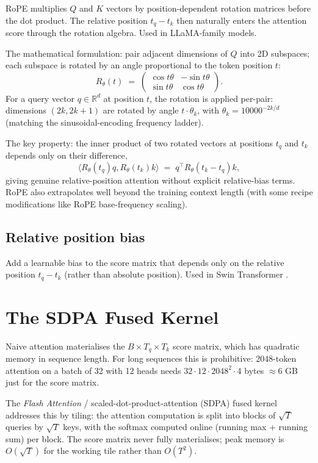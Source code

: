 RoPE \cite{su_roformer_2021} multiplies $Q$ and $K$ vectors by
position-dependent rotation matrices before the dot product.
The relative position $t_q - t_k$ then naturally enters the
attention score through the rotation algebra. Used in LLaMA-family
models.

The mathematical formulation: pair adjacent dimensions of $Q$
into 2D subspaces; each subspace is rotated by an angle
proportional to the token position $t$:
\[
  R_\theta(t)
  \;=\;
  \begin{pmatrix} \cos t\theta & -\sin t\theta \\
                  \sin t\theta &  \cos t\theta
  \end{pmatrix}.
\]
For a query vector $q \in \mathbb{R}^d$ at position $t$,
the rotation is applied per-pair: dimensions $(2k, 2k+1)$ are
rotated by angle $t \cdot \theta_k$, with
$\theta_k = 10000^{-2k/d}$ (matching the sinusoidal-encoding
frequency ladder).

The key property: the inner product of two rotated vectors at
positions $t_q$ and $t_k$ depends only on their difference,
\[
  \langle R_\theta(t_q) q, R_\theta(t_k) k \rangle
  \;=\;
  q^\top R_\theta(t_k - t_q) k,
\]
giving genuine relative-position attention without explicit
relative-bias terms. RoPE also extrapolates well beyond the
training context length (with some recipe modifications like
RoPE base-frequency scaling).

\subsection{Relative position bias}
\label{ssec:attention:rel_pos}

Add a learnable bias to the score matrix that depends only on
the relative position $t_q - t_k$ (rather than absolute
position). Used in Swin Transformer \cite{liu_swin_2021}.

\section{The SDPA Fused Kernel}
\label{sec:attention:sdpa_fused}

Naive attention materialises the $B \times T_q \times T_k$ score
matrix, which has quadratic memory in sequence length. For long
sequences this is prohibitive: 2048-token attention on a batch of
32 with 12 heads needs $32 \cdot 12 \cdot 2048^2 \cdot 4$ bytes
$\approx 6$ GB just for the score matrix.

The \emph{Flash Attention} / scaled-dot-product-attention
(SDPA) fused kernel addresses this by tiling: the attention
computation is split into blocks of $\sqrt{T}$ queries by
$\sqrt{T}$ keys, with the softmax computed online (running max +
running sum) per block. The score matrix never fully materialises;
peak memory is $O(\sqrt{T})$ for the working tile rather than
$O(T^2)$.

